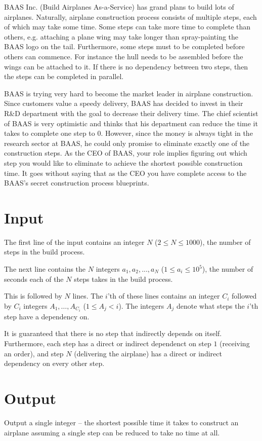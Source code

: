 BAAS Inc. (Build Airplanes As-a-Service) has grand plans to build lots of airplanes.
Naturally, airplane construction process consists of multiple steps, each of which may take some time.
Some steps can take more time to complete than others, e.g. attaching a plane wing may take longer than spray-painting the BAAS logo on the tail.
Furthermore, some steps must to be completed before others can commence.
For instance the hull needs to be assembled before the wings can be attached to it.
If there is no dependency between two steps, then the steps can be completed in parallel.

BAAS is trying very hard to become the market leader in airplane construction.
Since customers value a speedy delivery, BAAS has decided to invest in their R\&D department with the goal to decrease their delivery time.
The chief scientist of BAAS is very optimistic and thinks that his department can reduce the time it takes to complete one step to 0.
However, since the money is always tight in the research sector at BAAS, he could only promise to eliminate exactly one of the construction steps.
As the CEO of BAAS, your role implies figuring out which step you would like to eliminate to achieve the shortest possible construction time.
It goes without saying that as the CEO you have complete access to the BAAS's secret construction process blueprints.

\section*{Input}
The first line of the input contains an integer $N$ ($2 \le N \le 1000$), the number of steps in the build process.

The next line contains the $N$ integers $a_1, a_2, ..., a_N$ ($1 \le a_i \le 10^5$), the number of seconds each of the $N$ steps takes in the build process.

This is followed by $N$ lines.
The $i$'th of these lines contains an integer $C_i$ followed by $C_i$ integers $A_1, \dots, A_{C_i}$ ($1 \le A_j < i$).
The integers $A_j$ denote what steps the $i$'th step have a dependency on.

It is guaranteed that there is no step that indirectly depends on itself.
Furthermore, each step has a direct or indirect dependenct on step $1$ (receiving an order), and step $N$ (delivering the airplane) has a direct or indirect dependency on every other step.

\section*{Output}
Output a single integer -- the shortest possible time it takes to construct an airplane assuming a single step can be reduced to take no time at all.
